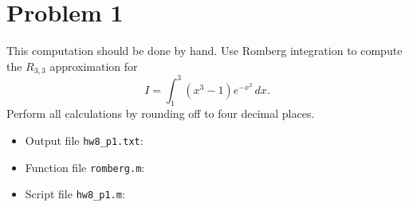 \section{Problem 1}%
\label{sec:problem_1}
This computation should be done by hand. Use Romberg integration to compute the $R_{3, 3}$ approximation for
\begin{equation}
  \label{eq:p1}
  I = \int_{1}^{3} (x^{3} - 1) e^{-x^{2}} \, dx.
\end{equation}
Perform all calculations by rounding off to four decimal places.
\begin{solution}
  \quad
  \begin{itemize}
  \item Output file \verb|hw8_p1.txt|:
    
  \item Function file \verb|romberg.m|:
    
  \item Script file \verb|hw8_p1.m|:
    
  \end{itemize}
\end{solution}

